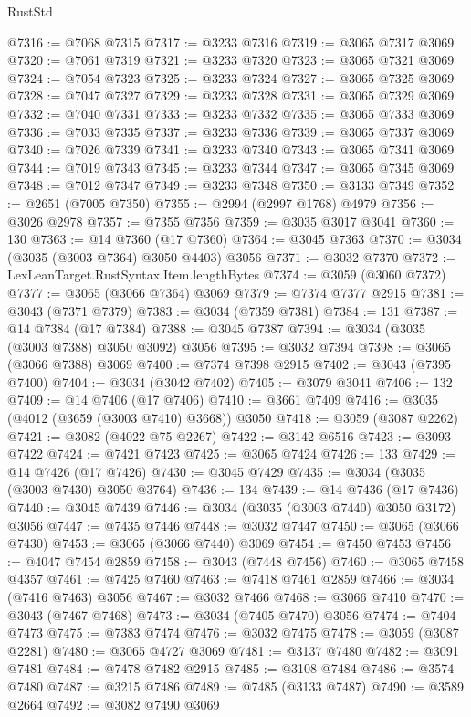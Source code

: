 \begin{lexlean}{RustStd}
\begin{coremodule}
@7316 := @7068 @7315
@7317 := @3233 @7316
@7319 := @3065 @7317 @3069
@7320 := @7061 @7319
@7321 := @3233 @7320
@7323 := @3065 @7321 @3069
@7324 := @7054 @7323
@7325 := @3233 @7324
@7327 := @3065 @7325 @3069
@7328 := @7047 @7327
@7329 := @3233 @7328
@7331 := @3065 @7329 @3069
@7332 := @7040 @7331
@7333 := @3233 @7332
@7335 := @3065 @7333 @3069
@7336 := @7033 @7335
@7337 := @3233 @7336
@7339 := @3065 @7337 @3069
@7340 := @7026 @7339
@7341 := @3233 @7340
@7343 := @3065 @7341 @3069
@7344 := @7019 @7343
@7345 := @3233 @7344
@7347 := @3065 @7345 @3069
@7348 := @7012 @7347
@7349 := @3233 @7348
@7350 := @3133 @7349
@7352 := @2651 (@7005 @7350)
@7355 := @2994 (@2997 @1768) @4979
@7356 := @3026 @2978
@7357 := @7355 @7356
@7359 := @3035 @3017 @3041
@7360 := 130
@7363 := @14 @7360 (@17 @7360)
@7364 := @3045 @7363
@7370 := @3034 (@3035 (@3003 @7364) @3050 @4403) @3056
@7371 := @3032 @7370
@7372 := LexLeanTarget.RustSyntax.Item.lengthBytes
@7374 := @3059 (@3060 @7372)
@7377 := @3065 (@3066 @7364) @3069
@7379 := @7374 @7377 @2915
@7381 := @3043 (@7371 @7379)
@7383 := @3034 (@7359 @7381)
@7384 := 131
@7387 := @14 @7384 (@17 @7384)
@7388 := @3045 @7387
@7394 := @3034 (@3035 (@3003 @7388) @3050 @3092) @3056
@7395 := @3032 @7394
@7398 := @3065 (@3066 @7388) @3069
@7400 := @7374 @7398 @2915
@7402 := @3043 (@7395 @7400)
@7404 := @3034 (@3042 @7402)
@7405 := @3079 @3041
@7406 := 132
@7409 := @14 @7406 (@17 @7406)
@7410 := @3661 @7409
@7416 := @3035 (@4012 (@3659 (@3003 @7410) @3668)) @3050
@7418 := @3059 (@3087 @2262)
@7421 := @3082 (@4022 @75 @2267)
@7422 := @3142 @6516
@7423 := @3093 @7422
@7424 := @7421 @7423
@7425 := @3065 @7424
@7426 := 133
@7429 := @14 @7426 (@17 @7426)
@7430 := @3045 @7429
@7435 := @3034 (@3035 (@3003 @7430) @3050 @3764)
@7436 := 134
@7439 := @14 @7436 (@17 @7436)
@7440 := @3045 @7439
@7446 := @3034 (@3035 (@3003 @7440) @3050 @3172) @3056
@7447 := @7435 @7446
@7448 := @3032 @7447
@7450 := @3065 (@3066 @7430)
@7453 := @3065 (@3066 @7440) @3069
@7454 := @7450 @7453
@7456 := @4047 @7454 @2859
@7458 := @3043 (@7448 @7456)
@7460 := @3065 @7458 @4357
@7461 := @7425 @7460
@7463 := @7418 @7461 @2859
@7466 := @3034 (@7416 @7463) @3056
@7467 := @3032 @7466
@7468 := @3066 @7410
@7470 := @3043 (@7467 @7468)
@7473 := @3034 (@7405 @7470) @3056
@7474 := @7404 @7473
@7475 := @7383 @7474
@7476 := @3032 @7475
@7478 := @3059 (@3087 @2281)
@7480 := @3065 @4727 @3069
@7481 := @3137 @7480
@7482 := @3091 @7481
@7484 := @7478 @7482 @2915
@7485 := @3108 @7484
@7486 := @3574 @7480
@7487 := @3215 @7486
@7489 := @7485 (@3133 @7487)
@7490 := @3589 @2664
@7492 := @3082 @7490 @3069

\end{coremodule}
\end{lexlean}
